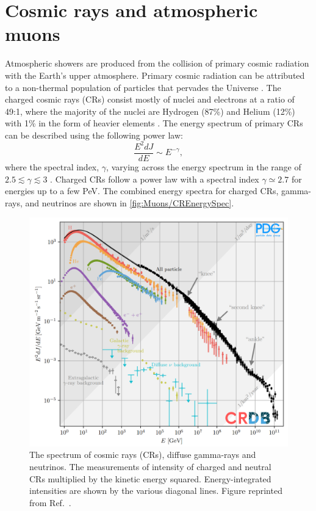 \section{Cosmic rays and atmospheric muons}\label{sec:Muons/CosmicRays}
Atmospheric showers are produced from the collision of primary cosmic radiation with the Earth's upper atmosphere. Primary cosmic radiation can be attributed to a non-thermal population of particles that pervades the Universe \cite{ParticleDataGroup:2024cfk}. The charged cosmic rays (CRs) consist mostly of nuclei and electrons at a ratio of 49:1, where the majority of the nuclei are Hydrogen (87\%) and Helium (12\%) with 1\% in the form of heavier elements \cite{Longair_2011}. The energy spectrum of primary CRs can be described using the following power law:
\begin{equation}\label{eqn:Muons/CREnergy}
    \frac{E^2dJ}{dE}\sim E^{-\gamma},
\end{equation}
where the spectral index, $\gamma$, varying across the energy spectrum in the range of $2.5\lesssim\gamma\lesssim3$ \cite{ParticleDataGroup:2024cfk}. Charged CRs follow a power law with a spectral index $\gamma\simeq2.7$ for energies up to a few PeV. The combined energy spectra for charged CRs, gamma-rays, and neutrinos are shown in \autoref{fig:Muons/CREnergySpec}.
\begin{figure}[h!]
    \centering
    \includegraphics[width=0.7\linewidth]{figures/Muons/CosmicRaySpectra.png}
    \caption[The spectrum of cosmic rays (CRs), diffuse gamma-rays and neutrinos.]{The spectrum of cosmic rays (CRs), diffuse gamma-rays and neutrinos. The measurements of intensity of charged and neutral CRs multiplied by the kinetic energy squared. Energy-integrated intensities are shown by the various diagonal lines. Figure reprinted from Ref.~\cite{ParticleDataGroup:2024cfk}.}
    \label{fig:Muons/CREnergySpec}
\end{figure}
